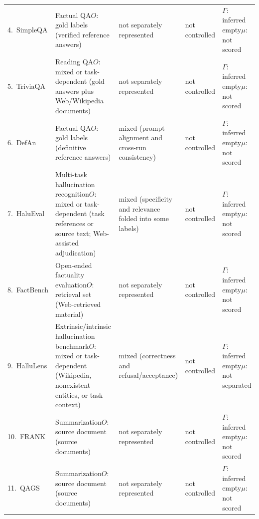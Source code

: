 \documentclass{clv2025}
\begin{document}
\begin{table}[t]
\begin{tabularx}{0.99\linewidth}{
  @{}P{0.17\textwidth}P{0.25\textwidth}
  P{0.15\textwidth}P{0.14\textwidth}Y@{}}
4.~SimpleQA \citep{wei_measuring_2024} & Factual QA\newline $O$: gold labels (verified reference answers) & not separately represented & not controlled & $\Gamma$: inferred empty\newline $\mu$: not scored\\
5.~TriviaQA \citep{joshi_triviaqa_2017} & Reading QA\newline $O$: mixed or task-dependent (gold answers plus Web/Wikipedia documents) & not separately represented & not controlled & $\Gamma$: inferred empty\newline $\mu$: not scored\\
6.~DefAn \citep{rahman_defan_2024} & Factual QA\newline $O$: gold labels (definitive reference answers) & mixed (prompt alignment and cross-run consistency) & not controlled & $\Gamma$: inferred empty\newline $\mu$: not scored\\
7.~HaluEval \citep{li_halueval_2023} & Multi-task hallucination recognition\newline $O$: mixed or task-dependent (task references or source text; Web-assisted adjudication) & mixed (specificity and relevance folded into some labels) & not controlled & $\Gamma$: inferred empty\newline $\mu$: not scored\\
8.~FactBench \citep{bayat_factbench_2024} & Open-ended factuality evaluation\newline $O$: retrieval set (Web-retrieved material) & not separately represented & not controlled & $\Gamma$: inferred empty\newline $\mu$: not scored\\
9.~HalluLens \citep{bang_hallulens_2025} & Extrinsic/intrinsic hallucination benchmark\newline $O$: mixed or task-dependent (Wikipedia, nonexistent entities, or task context) & mixed (correctness and refusal/acceptance) & not controlled & $\Gamma$: inferred empty\newline $\mu$: not separated\\
10.~FRANK \citep{pagnoni_understanding_2021} & Summarization\newline $O$: source document (source documents) & not separately represented & not controlled & $\Gamma$: inferred empty\newline $\mu$: not scored\\
11.~QAGS \citep{wang_asking_2020} & Summarization\newline $O$: source document (source documents) & not separately represented & not controlled & $\Gamma$: inferred empty\newline $\mu$: not scored\\

\end{tabularx}
\end{table}
\end{document}
